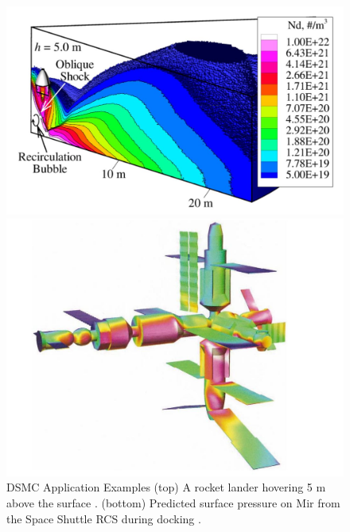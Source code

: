 \begin{figure}
    \centering
  \begin{minipage}[b]{0.49\textwidth}
    \includegraphics[width=\textwidth]{figures/hover_rocket.JPG}
  \end{minipage} %
  \begin{minipage}[b]{0.49\textwidth}
    \includegraphics[width=\textwidth]{figures/mir_shuttle.JPG}

  \end{minipage}
  \caption[DSMC Application Examples]{DSMC Application Examples (top) A rocket lander hovering 5 m above the surface \cite{hover_rocket}. (bottom) Predicted surface pressure on Mir from the Space Shuttle RCS during docking \cite{mir_shuttle}.}
  \label{fig:dsmc_application}
\end{figure}

